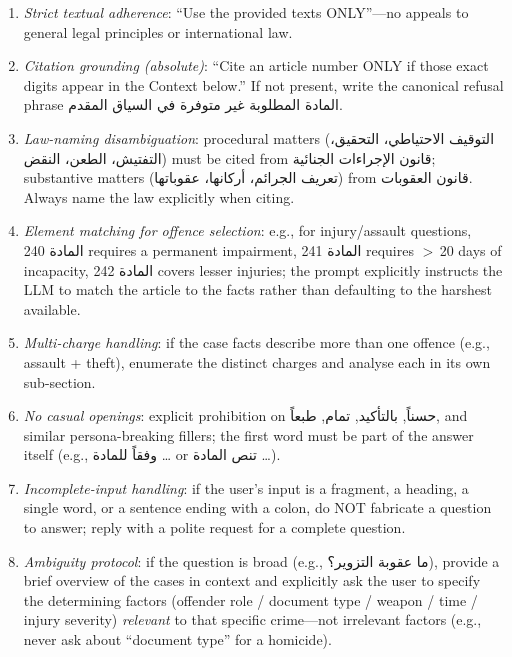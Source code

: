 \documentclass[final,1p,times]{elsarticle}
\newcommand{\ar}[1]{{\arabicfont\beginR #1\endR}}
\begin{document}
\begin{enumerate}
  \item \emph{Strict textual adherence}: ``Use the provided texts ONLY''---no
        appeals to general legal principles or international law.
  \item \emph{Citation grounding (absolute)}: ``Cite an article number ONLY
        if those exact digits appear in the Context below.'' If not present,
        write the canonical refusal phrase
        \ar{المادة المطلوبة غير متوفرة في السياق المقدم}.
  \item \emph{Law-naming disambiguation}: procedural matters
        (\ar{التوقيف الاحتياطي، التحقيق، التفتيش، الطعن، النقض}) must be
        cited from \ar{قانون الإجراءات الجنائية}; substantive matters
        (\ar{تعريف الجرائم، أركانها، عقوباتها}) from \ar{قانون العقوبات}.
        Always name the law explicitly when citing.
  \item \emph{Element matching for offence selection}: e.g., for
        injury/assault questions, \ar{المادة 240} requires a permanent
        impairment, \ar{المادة 241} requires $>$\,20 days of incapacity,
        \ar{المادة 242} covers lesser injuries; the prompt explicitly
        instructs the LLM to match the article to the facts rather than
        defaulting to the harshest available.
  \item \emph{Multi-charge handling}: if the case facts describe more than
        one offence (e.g., assault + theft), enumerate the distinct charges
        and analyse each in its own sub-section.
  \item \emph{No casual openings}: explicit prohibition on \ar{حسناً},
        \ar{بالتأكيد}, \ar{تمام}, \ar{طبعاً}, and similar persona-breaking
        fillers; the first word must be part of the answer itself (e.g.,
        \ar{وفقاً للمادة \dots} or \ar{تنص المادة \dots}).
  \item \emph{Incomplete-input handling}: if the user's input is a fragment,
        a heading, a single word, or a sentence ending with a colon, do NOT
        fabricate a question to answer; reply with a polite request for a
        complete question.
  \item \emph{Ambiguity protocol}: if the question is broad (e.g.,
        \ar{ما عقوبة التزوير؟}), provide a brief overview of the cases in
        context and explicitly ask the user to specify the determining
        factors (offender role / document type / weapon / time / injury
        severity) \emph{relevant} to that specific crime---not irrelevant
        factors (e.g., never ask about ``document type'' for a homicide).
\end{enumerate}
\end{document}
